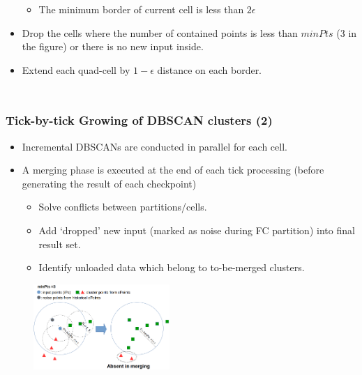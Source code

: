 \begin{frame}
\begin{columns}
\begin{itemize}
\begin{itemize}
                \item \tiny The minimum border of current cell is less than $2\epsilon$
            \end{itemize}
            \item \tiny Drop the cells where the number of contained points is less than $minPts$ (3 in the figure) or there is no new input inside.
            \item \tiny Extend each quad-cell by $1-\epsilon$ distance on each border.
        \end{itemize}
    \end{columns}
\end{frame}

\begin{frame}
    \frametitle{Tick-by-tick Growing of DBSCAN clusters (2)}
    \begin{itemize}
	    \item Incremental DBSCANs are conducted in parallel for each cell.
	    \item A merging phase is executed at the end of each tick processing (before generating the result of each checkpoint)
	    \begin{itemize}
	        \item \small Solve conflicts between partitions/cells.
            \item \small Add ‘dropped’ new input (marked as noise during FC partition) into final result set.
            \item \small Identify unloaded data which belong to to-be-merged clusters.
	    \end{itemize}
    \end{itemize}
    \begin{figure}
        \centering
        \includegraphics[width=0.46\textwidth]{resource/figures/merging-clusters.png}
    \end{figure}
\end{frame}

